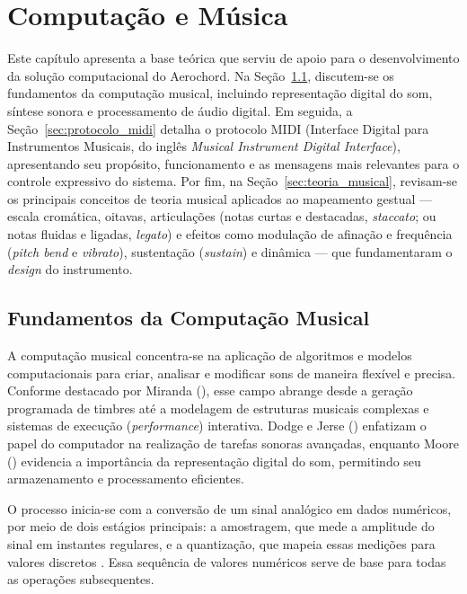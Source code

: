 \chapter{Computação e Música}
\label{cap:computacao_musical}

Este capítulo apresenta a base teórica que serviu de apoio para o desenvolvimento da solução computacional do Aerochord. Na Seção~\ref{sec:fundamentos_computacao_musical}, discutem-se os fundamentos da computação musical, incluindo representação digital do som, síntese sonora e processamento de áudio digital. Em seguida, a Seção~\ref{sec:protocolo_midi} detalha o protocolo MIDI (Interface Digital para Instrumentos Musicais, do inglês \textit{Musical Instrument Digital Interface}), apresentando seu propósito, funcionamento e as mensagens mais relevantes para o controle expressivo do sistema. Por fim, na Seção~\ref{sec:teoria_musical}, revisam-se os principais conceitos de teoria musical aplicados ao mapeamento gestual — escala cromática, oitavas, articulações (notas curtas e destacadas, \textit{staccato}; ou notas fluidas e ligadas, \textit{legato}) e efeitos como modulação de afinação e frequência (\textit{pitch bend} e \textit{vibrato}), sustentação (\textit{sustain}) e dinâmica — que fundamentaram o \textit{design} do instrumento.

\section{Fundamentos da Computação Musical}
\label{sec:fundamentos_computacao_musical}

A computação musical concentra-se na aplicação de algoritmos e modelos computacionais para criar, analisar e modificar sons de maneira flexível e precisa. Conforme destacado por Miranda (\citeyear{Miranda2002}), esse campo abrange desde a geração programada de timbres até a modelagem de estruturas musicais complexas e sistemas de execução (\textit{performance}) interativa. Dodge e Jerse (\citeyear{Dodge1997}) enfatizam o papel do computador na realização de tarefas sonoras avançadas, enquanto Moore (\citeyear{Moore1990}) evidencia a importância da representação digital do som, permitindo seu armazenamento e processamento eficientes.

O processo inicia-se com a conversão de um sinal analógico em dados numéricos, por meio de dois estágios principais: a amostragem, que mede a amplitude do sinal em instantes regulares, e a quantização, que mapeia essas medições para valores discretos \cite{Rossing2002}. Essa sequência de valores numéricos serve de base para todas as operações subsequentes.


